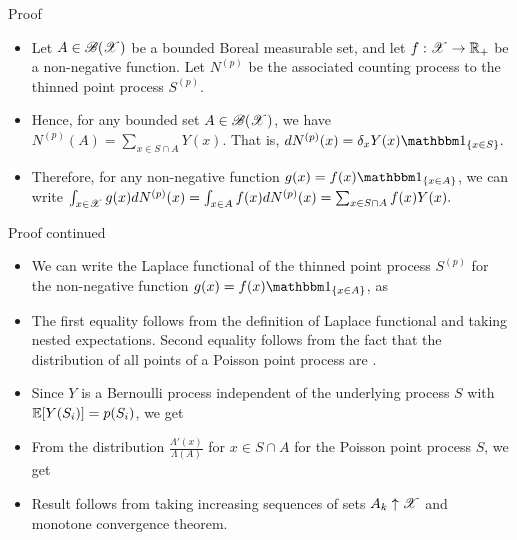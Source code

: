 \documentclass[12pt,aspectratio=169]{beamer}
\begin{document}
\begin{frame}
\begin{block}{Proof}
\begin{itemize}
\item Let $A \in \mathscr{B}(\mathscr{X})$ be a bounded Boreal measurable set, and let $f: \mathscr{X} \to \mathbb{R}_+$ be a non-negative function. 
Let $N^{(p)}$ be the associated counting process to the thinned point process $S^{(p)}$. 
\item <2-> Hence, for any bounded set $A \in \mathscr{B}(\mathscr{X})$, we have $N^{(p)}(A) = \sum_{x \in S \cap A}Y(x)$. 
That is, 
$
dN^{(p)}(x) 
= \delta_{x}Y(x)\SetIn{x \in S}.
$
\item <3-> Therefore, for any non-negative function $g(x) = f(x)\SetIn{x \in A}$, we can write 
$
\int_{x \in \mathscr{X}}g(x)dN^{(p)}(x) 
= \int_{x \in A}f(x)dN^{(p)}(x) 
= \sum_{x \in S\cap A}f(x)Y(x).
$
\end{itemize}
\end{block}
\end{frame}


\begin{frame}
\begin{block}{Proof continued}
\begin{itemize}
\item We can write the Laplace functional of the thinned point process $S^{(p)}$ for the non-negative function $g(x) = f(x)\SetIn{x \in A}$, as 
\item <2-> The first equality follows from the definition of Laplace functional and taking nested expectations. 
Second equality follows from the fact that the distribution of all points of a Poisson point process are  \iid. 
\end{itemize}
\end{block}
\end{frame}

\begin{frame}
\begin{Proof}
\begin{itemize}
\item Since $Y$ is a Bernoulli process independent of the underlying process $S$ with $\mathbb{E}[Y(S_i)] = p(S_i)$, we get 
\item <2-> From the distribution $\frac{\Lambda'(x)}{\Lambda(A)}$ for $x \in S \cap A$ for the Poisson point process $S$, we get  
\item <3-> Result follows from taking increasing sequences of sets $A_k \uparrow \mathscr{X}$ and monotone convergence theorem.
\end{itemize}
\end{Proof}
\end{frame}
\end{document}
